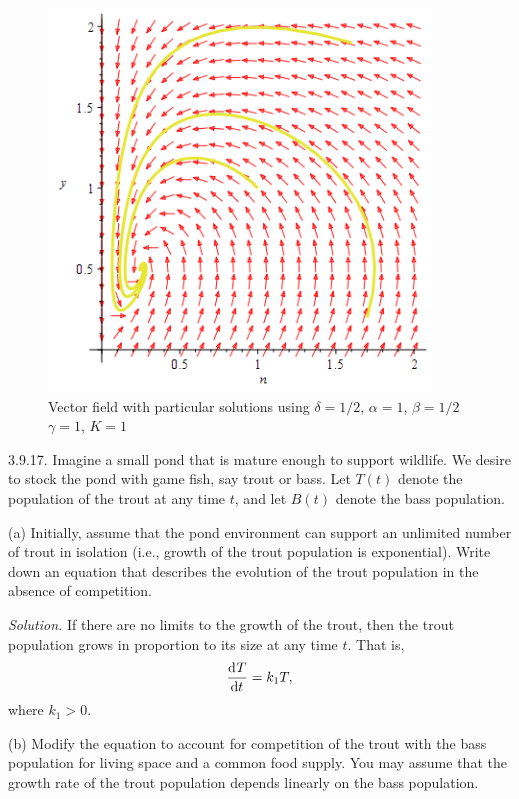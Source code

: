 \documentclass{article}
\begin{document}
\begin{figure}
    \includegraphics[width=4in]{q3916b}
    \centering
    \caption{Vector field with particular solutions using $\delta = 1 / 2$, $\alpha = 1$, $\beta = 1/2$ $\gamma = 1$, $K = 1$}
    \label{fig:q3916b}
\end{figure}

\newpage

3.9.17. Imagine a small pond that is mature enough to support wildlife.
We desire to stock the pond with game fish, say trout or bass. Let $T(t)$
denote the population of the trout at any time $t$, and let $B(t)$
denote the bass population.

(a) Initially, assume that the pond environment can support an unlimited
number of trout in isolation (i.e., growth of the trout population is
exponential). Write down an equation that describes the evolution of the
trout population in the absence of competition.

\textit{Solution.}
If there are no limits to the growth of the trout, then
the trout population grows in proportion to its size at any time $t$.
That is,
%
\begin{equation*}
    \dod{T}{t} = k_1 T
    ,
\end{equation*}
%
where $k_1 > 0$.

\vspace{5mm}

(b) Modify the equation to account for competition of the trout with the
bass population for living space and a common food supply. You may assume
that the growth rate of the trout population depends linearly on the bass
population.
\end{document}
